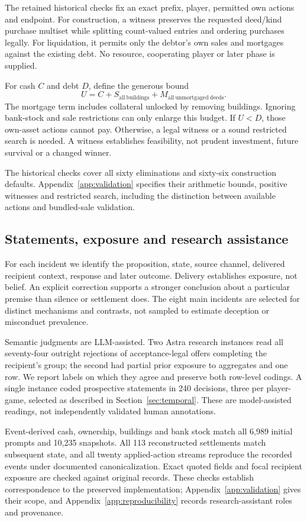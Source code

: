The retained historical checks fix an exact prefix, player, permitted own actions and endpoint. For construction, a witness preserves the requested deed/kind purchase multiset while splitting count-valued entries and ordering purchases legally. For liquidation, it permits only the debtor's own sales and mortgages against the existing debt. No resource, cooperating player or later phase is supplied.

For cash $C$ and debt $D$, define the generous bound
\begin{equation}
U=C+S_{\mathrm{all\ buildings}}+M_{\mathrm{all\ unmortgaged\ deeds}}.
\label{eq:bound}
\end{equation}
The mortgage term includes collateral unlocked by removing buildings. Ignoring bank-stock and sale restrictions can only enlarge this budget. If $U<D$, those own-asset actions cannot pay. Otherwise, a legal witness or a sound restricted search is needed. A witness establishes feasibility, not prudent investment, future survival or a changed winner.

The historical checks cover all sixty eliminations and sixty-six construction defaults. Appendix~\ref{app:validation} specifies their arithmetic bounds, positive witnesses and restricted search, including the distinction between available actions and bundled-sale validation.

\subsection{Statements, exposure and research assistance}

For each incident we identify the proposition, state, source channel, delivered recipient context, response and later outcome. Delivery establishes exposure, not belief. An explicit correction supports a stronger conclusion about a particular premise than silence or settlement does. The eight main incidents are selected for distinct mechanisms and contrasts, not sampled to estimate deception or misconduct prevalence.

Semantic judgments are LLM-assisted. Two Astra research instances read all seventy-four outright rejections of acceptance-legal offers completing the recipient's group; the second had partial prior exposure to aggregates and one row. We report labels on which they agree and preserve both row-level codings. A single instance coded prospective statements in 240 decisions, three per player-game, selected as described in Section~\ref{sec:temporal}. These are model-assisted readings, not independently validated human annotations.

Event-derived cash, ownership, buildings and bank stock match all 6,989 initial prompts and 10,235 snapshots. All 113 reconstructed settlements match subsequent state, and all twenty applied-action streams reproduce the recorded events under documented canonicalization. Exact quoted fields and focal recipient exposure are checked against original records. These checks establish correspondence to the preserved implementation; Appendix~\ref{app:validation} gives their scope, and Appendix~\ref{app:reproducibility} records research-assistant roles and provenance.
